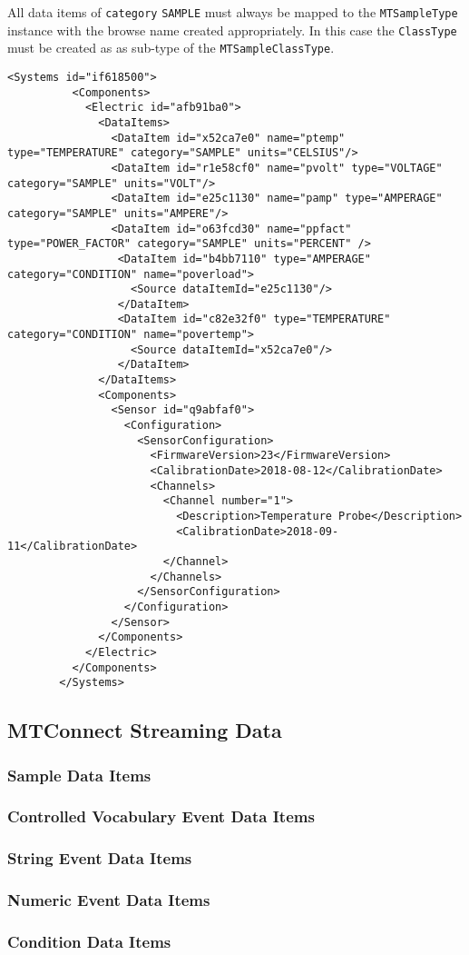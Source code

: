 All data items of \texttt{category} \texttt{SAMPLE} must always be mapped to the \texttt{MTSampleType} instance with the browse name created appropriately. In this case the \texttt{ClassType} must be created as as sub-type of the \texttt{MTSampleClassType}.

\begin{lstlisting}[firstnumber=last,%
    caption={Electrical System and Sensor Configuration},label={lst:electric-system-example-1}]
        <Systems id="if618500">
          <Components>
            <Electric id="afb91ba0">
              <DataItems>
                <DataItem id="x52ca7e0" name="ptemp" type="TEMPERATURE" category="SAMPLE" units="CELSIUS"/>
                <DataItem id="r1e58cf0" name="pvolt" type="VOLTAGE" category="SAMPLE" units="VOLT"/>
                <DataItem id="e25c1130" name="pamp" type="AMPERAGE" category="SAMPLE" units="AMPERE"/>
                <DataItem id="o63fcd30" name="ppfact" type="POWER_FACTOR" category="SAMPLE" units="PERCENT" />
                 <DataItem id="b4bb7110" type="AMPERAGE" category="CONDITION" name="poverload">
                   <Source dataItemId="e25c1130"/>
                 </DataItem>
                 <DataItem id="c82e32f0" type="TEMPERATURE" category="CONDITION" name="povertemp">
                   <Source dataItemId="x52ca7e0"/>
                 </DataItem>
              </DataItems>
              <Components>
                <Sensor id="q9abfaf0">
                  <Configuration>
                    <SensorConfiguration>
                      <FirmwareVersion>23</FirmwareVersion>
                      <CalibrationDate>2018-08-12</CalibrationDate>
                      <Channels>
                        <Channel number="1">
                          <Description>Temperature Probe</Description>
                          <CalibrationDate>2018-09-11</CalibrationDate>
                        </Channel>
                      </Channels>
                    </SensorConfiguration>
                  </Configuration>
                </Sensor>              
              </Components>
            </Electric>
          </Components>
        </Systems>
\end{lstlisting}

\subsection{MTConnect Streaming Data}

\subsubsection{Sample Data Items}

\subsubsection{Controlled Vocabulary Event Data Items}

\subsubsection{String Event Data Items}

\subsubsection{Numeric Event Data Items}

\subsubsection{Condition Data Items}
